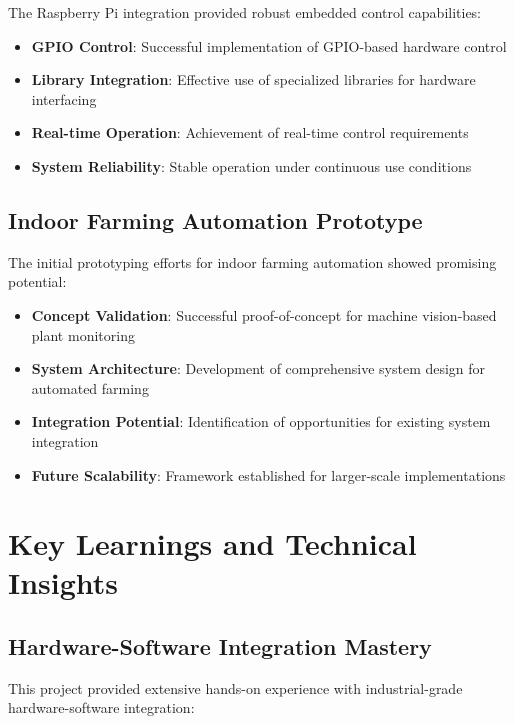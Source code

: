 \documentclass{book}
\begin{document}
\par\noindent The Raspberry Pi integration provided robust embedded control capabilities:

\begin{itemize}
\item \textbf{GPIO Control}: Successful implementation of GPIO-based hardware control
\item \textbf{Library Integration}: Effective use of specialized libraries for hardware interfacing
\item \textbf{Real-time Operation}: Achievement of real-time control requirements
\item \textbf{System Reliability}: Stable operation under continuous use conditions
\end{itemize}

\section{Indoor Farming Automation Prototype}

\par\noindent The initial prototyping efforts for indoor farming automation showed promising potential:

\begin{itemize}
\item \textbf{Concept Validation}: Successful proof-of-concept for machine vision-based plant monitoring
\item \textbf{System Architecture}: Development of comprehensive system design for automated farming
\item \textbf{Integration Potential}: Identification of opportunities for existing system integration
\item \textbf{Future Scalability}: Framework established for larger-scale implementations
\end{itemize}

\chapter{Key Learnings and Technical Insights}

\section{Hardware-Software Integration Mastery}

\par\noindent This project provided extensive hands-on experience with industrial-grade hardware-software integration:
\end{document}
